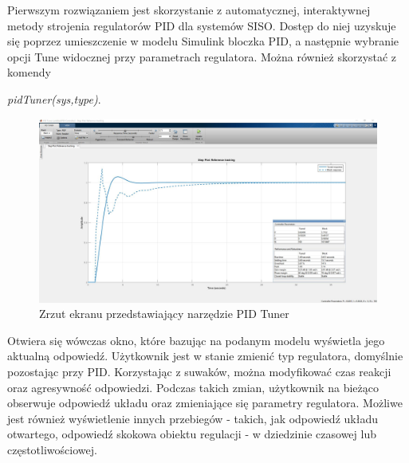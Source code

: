 Pierwszym rozwiązaniem jest skorzystanie z automatycznej, interaktywnej metody  strojenia regulatorów PID dla systemów SISO. Dostęp do niej uzyskuje się poprzez umieszczenie w modelu Simulink bloczka PID, a następnie wybranie opcji Tune widocznej przy parametrach regulatora.
Można również skorzystać z komendy

\textit{pidTuner(sys,type)}.

\begin{figure}[H]
	\includegraphics[width=160mm]{PID_Tuner}
	\caption{Zrzut ekranu przedstawiający narzędzie PID Tuner}
	\label{fig:PID_Tuner}
\end{figure}

\noindent Otwiera się wówczas okno, które bazując na podanym modelu wyświetla jego aktualną odpowiedź. Użytkownik jest w stanie zmienić typ regulatora, domyślnie pozostając przy PID. Korzystając z suwaków, można modyfikować czas reakcji oraz agresywność odpowiedzi. Podczas takich zmian, użytkownik na bieżąco obserwuje odpowiedź układu oraz zmieniające się parametry regulatora.
Możliwe jest również wyświetlenie innych przebiegów - takich, jak odpowiedź układu otwartego, odpowiedź skokowa obiektu regulacji - w dziedzinie czasowej lub częstotliwościowej.


